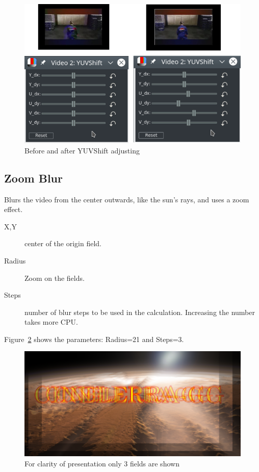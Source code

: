 \begin{figure}[hbtp]
    \centering
    \includegraphics[width=0.7\linewidth]{images/yuvshift.png}
    \caption{Before and after YUVShift adjusting}
    \label{fig:yuvshift}
\end{figure}

\subsection{Zoom Blur}%
\label{sub:zoom_blur}

Blurs the video from the center outwards, like the sun’s rays, and uses a zoom effect.

\begin{description}
    \item[X,Y] center of the origin field.
    \item[Radius] Zoom on the fields.
    \item[Steps] number of blur steps to be used in the calculation. Increasing the number takes more CPU.
\end{description}

Figure~\ref{fig:zoom} shows the parameters: Radius=21 and Steps=3.

\begin{figure}[hbtp]
    \centering
    \includegraphics[width=0.8\linewidth]{images/zoom.png}
    \caption{For clarity of presentation only 3 fields are shown}
    \label{fig:zoom}
\end{figure}

